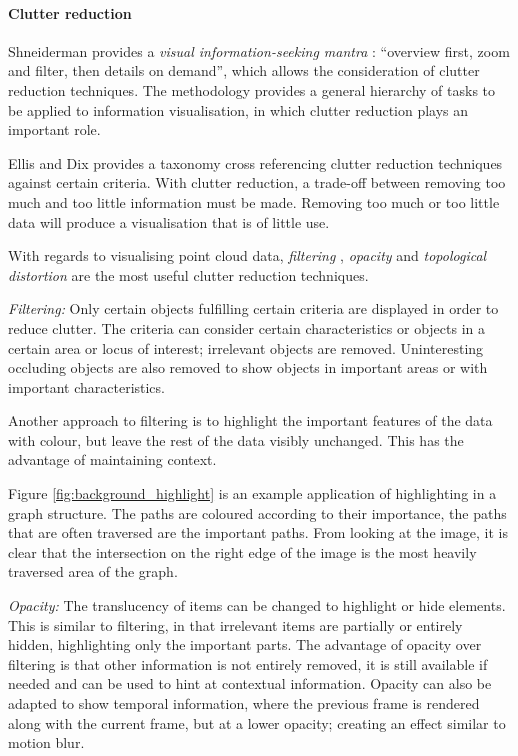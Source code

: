 \paragraph{Clutter reduction}
\label{sub:background_clutter}

Shneiderman provides a \emph{visual information-seeking mantra}
\citep{shneiderman96}: ``overview first, zoom and filter, then details on
demand'', which allows the consideration of clutter reduction techniques. The
methodology provides a general hierarchy of tasks to be applied to information
visualisation, in which clutter reduction plays an important role.

Ellis and Dix \citep{ellis07} provides a taxonomy cross referencing clutter
reduction techniques against certain criteria. With clutter reduction, a
trade-off between removing too much and too little information must be made.
Removing too much or too little data will produce a visualisation that is of
little use.

With regards to visualising point cloud data, \emph{filtering} \citep{stone94},
\emph{opacity} \citep{kosara02} and \emph{topological distortion}
\citep{lamping96} are the most useful clutter reduction techniques.

\emph{Filtering:} Only certain objects fulfilling certain criteria are
displayed in order to reduce clutter. The criteria can consider certain
characteristics or objects in a certain area or locus of interest; irrelevant
objects are removed. Uninteresting occluding objects are also removed to show
objects in important areas or with important characteristics.

Another approach to filtering is to highlight the important features of the
data with colour, but leave the rest of the data visibly unchanged. This has
the advantage of maintaining context.

Figure \ref{fig:background_highlight} is an example application of highlighting
in a graph structure. The paths are coloured according to their importance, the
paths that are often traversed are the important paths. From looking at the
image, it is clear that the intersection on the right edge of the image is the
most heavily traversed area of the graph.

\emph{Opacity:} The translucency of items can be changed to highlight or hide
elements. This is similar to filtering, in that irrelevant items are partially
or entirely hidden, highlighting only the important parts. The advantage of
opacity over filtering is that other information is not entirely removed, it is
still available if needed and can be used to hint at contextual information.
Opacity can also be adapted to show temporal information, where the previous
frame is rendered along with the current frame, but at a lower opacity;
creating an effect similar to motion blur.

